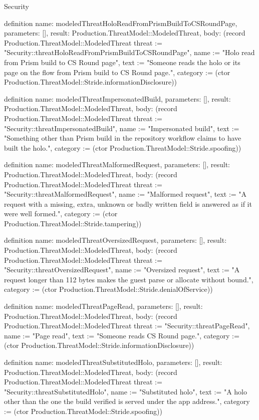 \begin{lexlean}{Security}
\begin{semanticmodule}
definition{
  name: modeledThreatHoloReadFromPrismBuildToCSRoundPage,
  parameters: [],
  result: Production.ThreatModel::ModeledThreat,
  body: (record Production.ThreatModel::ModeledThreat {threat := "Security::threatHoloReadFromPrismBuildToCSRoundPage", name := "Holo read from Prism build to CS Round page", text := "Someone reads the holo or its page on the flow from Prism build to CS Round page.", category := (ctor Production.ThreatModel::Stride.informationDisclosure)})
}

definition{
  name: modeledThreatImpersonatedBuild,
  parameters: [],
  result: Production.ThreatModel::ModeledThreat,
  body: (record Production.ThreatModel::ModeledThreat {threat := "Security::threatImpersonatedBuild", name := "Impersonated build", text := "Something other than Prism build in the repository workflow claims to have built the holo.", category := (ctor Production.ThreatModel::Stride.spoofing)})
}

definition{
  name: modeledThreatMalformedRequest,
  parameters: [],
  result: Production.ThreatModel::ModeledThreat,
  body: (record Production.ThreatModel::ModeledThreat {threat := "Security::threatMalformedRequest", name := "Malformed request", text := "A request with a missing, extra, unknown or badly written field is answered as if it were well formed.", category := (ctor Production.ThreatModel::Stride.tampering)})
}

definition{
  name: modeledThreatOversizedRequest,
  parameters: [],
  result: Production.ThreatModel::ModeledThreat,
  body: (record Production.ThreatModel::ModeledThreat {threat := "Security::threatOversizedRequest", name := "Oversized request", text := "A request longer than 112 bytes makes the guest parse or allocate without bound.", category := (ctor Production.ThreatModel::Stride.denialOfService)})
}

definition{
  name: modeledThreatPageRead,
  parameters: [],
  result: Production.ThreatModel::ModeledThreat,
  body: (record Production.ThreatModel::ModeledThreat {threat := "Security::threatPageRead", name := "Page read", text := "Someone reads CS Round page.", category := (ctor Production.ThreatModel::Stride.informationDisclosure)})
}

definition{
  name: modeledThreatSubstitutedHolo,
  parameters: [],
  result: Production.ThreatModel::ModeledThreat,
  body: (record Production.ThreatModel::ModeledThreat {threat := "Security::threatSubstitutedHolo", name := "Substituted holo", text := "A holo other than the one the build verified is served under the app address.", category := (ctor Production.ThreatModel::Stride.spoofing)})
}


\end{semanticmodule}
\end{lexlean}
